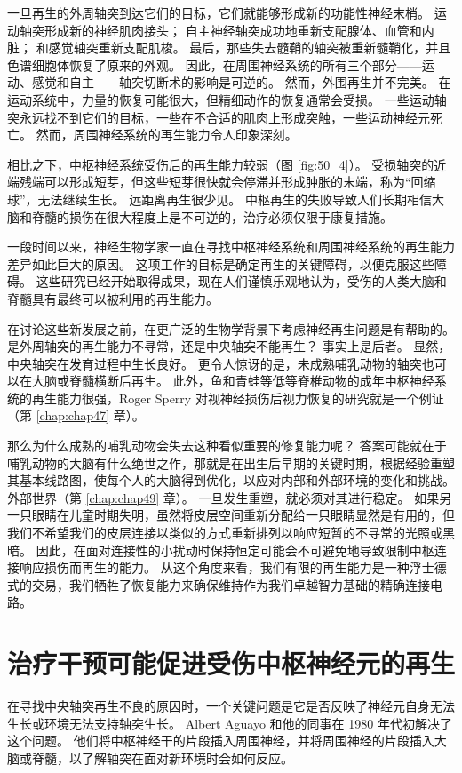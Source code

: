 一旦再生的外周轴突到达它们的目标，它们就能够形成新的功能性神经末梢。 运动轴突形成新的神经肌肉接头； 自主神经轴突成功地重新支配腺体、血管和内脏； 和感觉轴突重新支配肌梭。 最后，那些失去髓鞘的轴突被重新髓鞘化，并且色谱细胞体恢复了原来的外观。 因此，在周围神经系统的所有三个部分——运动、感觉和自主——轴突切断术的影响是可逆的。 然而，外围再生并不完美。 在运动系统中，力量的恢复可能很大，但精细动作的恢复通常会受损。 一些运动轴突永远找不到它们的目标，一些在不合适的肌肉上形成突触，一些运动神经元死亡。 然而，周围神经系统的再生能力令人印象深刻。

相比之下，中枢神经系统受伤后的再生能力较弱（图 \ref{fig:50_4}）。 受损轴突的近端残端可以形成短芽，但这些短芽很快就会停滞并形成肿胀的末端，称为“回缩球”，无法继续生长。 远距离再生很少见。 中枢再生的失败导致人们长期相信大脑和脊髓的损伤在很大程度上是不可逆的，治疗必须仅限于康复措施。

一段时间以来，神经生物学家一直在寻找中枢神经系统和周围神经系统的再生能力差异如此巨大的原因。 这项工作的目标是确定再生的关键障碍，以便克服这些障碍。 这些研究已经开始取得成果，现在人们谨慎乐观地认为，受伤的人类大脑和脊髓具有最终可以被利用的再生能力。

在讨论这些新发展之前，在更广泛的生物学背景下考虑神经再生问题是有帮助的。 是外周轴突的再生能力不寻常，还是中央轴突不能再生？ 事实上是后者。 显然，中央轴突在发育过程中生长良好。 更令人惊讶的是，未成熟哺乳动物的轴突也可以在大脑或脊髓横断后再生。 此外，鱼和青蛙等低等脊椎动物的成年中枢神经系统的再生能力很强，Roger Sperry 对视神经损伤后视力恢复的研究就是一个例证（第 \ref{chap:chap47} 章）。

那么为什么成熟的哺乳动物会失去这种看似重要的修复能力呢？ 答案可能就在于哺乳动物的大脑有什么绝世之作，那就是在出生后早期的关键时期，根据经验重塑其基本线路图，使每个人的大脑得到优化，以应对内部和外部环境的变化和挑战。 外部世界（第 \ref{chap:chap49} 章）。 一旦发生重塑，就必须对其进行稳定。 如果另一只眼睛在儿童时期失明，虽然将皮层空间重新分配给一只眼睛显然是有用的，但我们不希望我们的皮层连接以类似的方式重新排列以响应短暂的不寻常的光照或黑暗。 因此，在面对连接性的小扰动时保持恒定可能会不可避免地导致限制中枢连接响应损伤而再生的能力。 从这个角度来看，我们有限的再生能力是一种浮士德式的交易，我们牺牲了恢复能力来确保维持作为我们卓越智力基础的精确连接电路。

\section{治疗干预可能促进受伤中枢神经元的再生}
在寻找中央轴突再生不良的原因时，一个关键问题是它是否反映了神经元自身无法生长或环境无法支持轴突生长。 Albert Aguayo 和他的同事在 1980 年代初解决了这个问题。 他们将中枢神经干的片段插入周围神经，并将周围神经的片段插入大脑或脊髓，以了解轴突在面对新环境时会如何反应。

